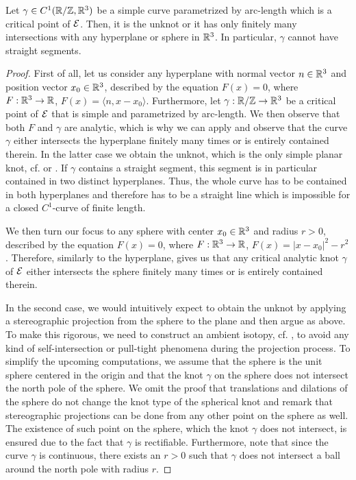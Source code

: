 \begin{proposition}
	\label{corollary:UnknotEllipsoidHyperplane}
	Let $\gamma \in C^1(\mathbb{R}/\mathbb{Z},\mathbb{R}^3)$ be a simple curve parametrized by arc-length which is a critical point of $\mathcal{E}$.
	Then, it is the unknot or it has only finitely many intersections with any hyperplane or sphere	in $\mathbb{R}^3$.
	In particular, $\gamma$ cannot have straight segments.
\end{proposition}
\begin{proof}
	First of all, let us consider any hyperplane with normal vector $n\in\mathbb{R}^3$ and position vector $x_0\in\mathbb{R}^3$, described by the equation $F(x)=0$, where  $F:\mathbb{R}^3\rightarrow\mathbb{R}$, $F(x)= \langle n,x-x_0\rangle$. Furthermore, let $\gamma:\mathbb{R}/\mathbb{Z}\rightarrow \mathbb{R}^3$ be a critical point of $\mathcal{E}$ that is simple and parametrized by arc-length. We then observe that both $F$ and $\gamma$ are analytic, which is why we can apply  and observe that the curve $\gamma$ either intersects the hyperplane finitely many times or is entirely contained therein. In the latter case we obtain the unknot, which is the only simple planar knot, cf. \cite[p.~5]{CrowellFox:1977:Introductiontoknottheory} or \cite[Chapter~VI,~18.]{Newman:1951:ElementsOfTopology}.
    If $\gamma$ contains a straight segment, this segment is in particular contained in two distinct hyperplanes.
    Thus, the whole curve has to be contained in both hyperplanes and therefore has to be a straight line which is impossible for a closed $C^1$-curve of finite length.
	
	We then turn our focus to any sphere with center $x_0\in\mathbb{R}^3$ and radius $r>0$, described by the equation $F(x) =0$, where $F:\mathbb{R}^3 \rightarrow \mathbb{R}$, $F(x) = |x-x_0|^2 -r^2$.
    Therefore, similarly to the hyperplane,  gives us that any critical analytic knot $\gamma$  of $\mathcal{E}$ either intersects the sphere finitely many times or is entirely contained therein. 

	In the second case, we would intuitively expect to obtain the unknot by applying a stereographic projection from the sphere to the plane and then argue as above. To make this rigorous, we need to construct an ambient isotopy, cf. \cite[Chapter~8.1]{Hirsch:1976:DifferentialTopology}, to avoid any kind of self-intersection or pull-tight phenomena during the projection process. 
	To simplify the upcoming computations, we assume that the sphere is the unit sphere centered in the origin and that the knot $\gamma$ on the sphere does not intersect the north pole of the sphere. We omit the proof that translations and dilations of the sphere do not change the knot type of the spherical knot and remark that stereographic projections can be done from any other point on the sphere as well. The existence of such point on the sphere, which the knot $\gamma$ does not intersect, is ensured due to the fact that $\gamma$ is rectifiable. Furthermore, note that since the curve $\gamma$ is continuous, there exists an $r>0$ such that $\gamma$ does not intersect a ball around the north pole with radius $r$.
	

\end{proof}
